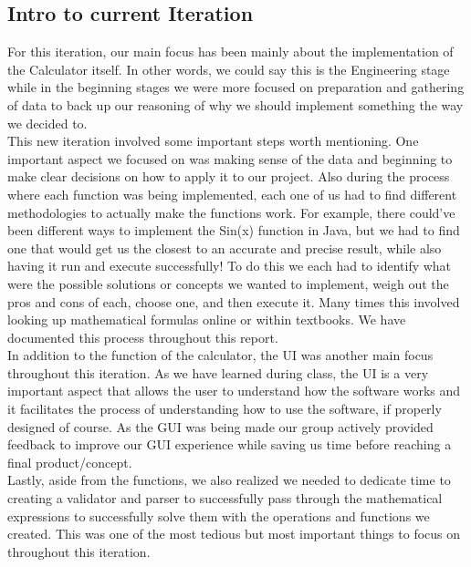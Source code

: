 \documentclass[a4paper, 12pt]{article}
\begin{document}
\subsection{Intro to current Iteration}

For this iteration, our main focus has been mainly about the implementation of the Calculator itself. In other words, we could say this is the Engineering stage while in the beginning stages we were more focused on preparation and gathering of data to back up our reasoning of why we should implement something the way we decided to. 
\\

This new iteration involved some important steps worth mentioning. One important aspect we focused on was making sense of the data and beginning to make clear decisions on how to apply it to our project. Also during the process where each function was being implemented, each one of us had to find different methodologies to actually make the functions work. For example, there could’ve been different ways to implement the Sin(x) function in Java, but we had to find one that would get us the closest to an accurate and precise result, while also having it run and execute successfully! To do this we each had to identify what were the possible solutions or concepts we wanted to implement, weigh out the pros and cons of each, choose one, and then execute it. Many times this involved looking up mathematical formulas online or within textbooks. We have documented this process throughout this report. 
\\

In addition to the function of the calculator, the UI was another main focus throughout this iteration. As we have learned during class, the UI is a very important aspect that allows the user to understand how the software works and it facilitates the process of understanding how to use the software, if properly designed of course. As the GUI was being made our group actively provided feedback to improve our GUI experience while saving us time before reaching a final product/concept. 
\\

Lastly, aside from the functions, we also realized we needed to dedicate time to creating a validator and parser to successfully pass through the mathematical expressions to successfully solve them with the operations and functions we created. This was one of the most tedious but most important things to focus on throughout this iteration. 
\\
\end{document}
